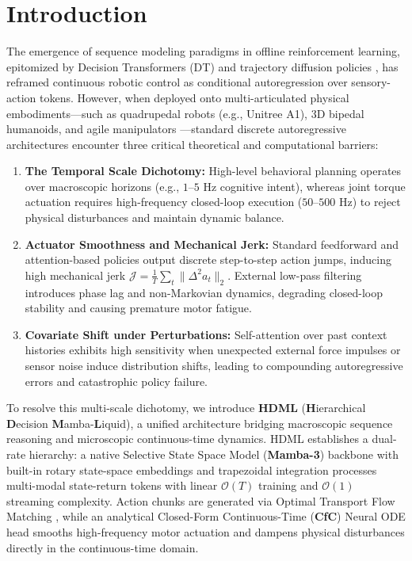 \documentclass{article}
\begin{document}

\section{Introduction}
\label{sec:intro}

The emergence of sequence modeling paradigms in offline reinforcement learning, epitomized by Decision Transformers (DT) \cite{chen2021decision} and trajectory diffusion policies \cite{chi2023diffusion}, has reframed continuous robotic control as conditional autoregression over sensory-action tokens. However, when deployed onto multi-articulated physical embodiments---such as quadrupedal robots (e.g., Unitree A1), 3D bipedal humanoids, and agile manipulators \cite{zhao2023learning, brohan2023rt2}---standard discrete autoregressive architectures encounter three critical theoretical and computational barriers:

\begin{enumerate}
    \item \textbf{The Temporal Scale Dichotomy:} High-level behavioral planning operates over macroscopic horizons (e.g., $1$--$5\text{ Hz}$ cognitive intent), whereas joint torque actuation requires high-frequency closed-loop execution ($50$--$500\text{ Hz}$) to reject physical disturbances and maintain dynamic balance.
    \item \textbf{Actuator Smoothness and Mechanical Jerk:} Standard feedforward and attention-based policies output discrete step-to-step action jumps, inducing high mechanical jerk $\mathcal{J} = \frac{1}{T}\sum_t \|\Delta^2 a_t\|_2$. External low-pass filtering introduces phase lag and non-Markovian dynamics, degrading closed-loop stability and causing premature motor fatigue.
    \item \textbf{Covariate Shift under Perturbations:} Self-attention over past context histories exhibits high sensitivity when unexpected external force impulses or sensor noise induce distribution shifts, leading to compounding autoregressive errors and catastrophic policy failure.
\end{enumerate}

To resolve this multi-scale dichotomy, we introduce \textbf{HDML} (\textbf{H}ierarchical \textbf{D}ecision \textbf{M}amba-\textbf{L}iquid), a unified architecture bridging macroscopic sequence reasoning and microscopic continuous-time dynamics. HDML establishes a dual-rate hierarchy: a native Selective State Space Model (\textbf{Mamba-3}) backbone \cite{gu2023mamba} with built-in rotary state-space embeddings and trapezoidal integration processes multi-modal state-return tokens with linear $\mathcal{O}(T)$ training and $\mathcal{O}(1)$ streaming complexity. Action chunks are generated via Optimal Transport Flow Matching \cite{lipman2023flow}, while an analytical Closed-Form Continuous-Time (\textbf{CfC}) Neural ODE head \cite{hasani2022closed, lechner2020neural} smooths high-frequency motor actuation and dampens physical disturbances directly in the continuous-time domain.
\end{document}
